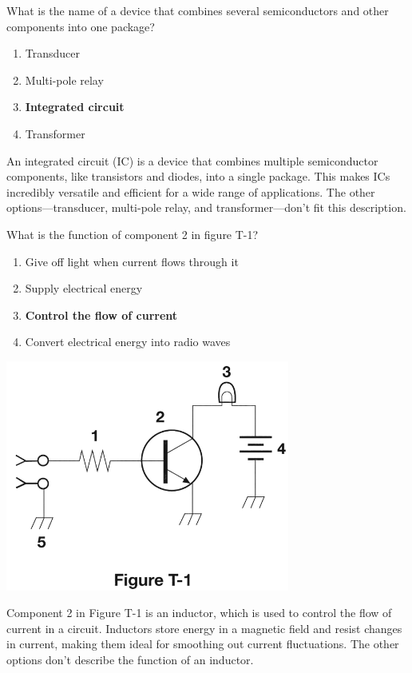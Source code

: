 \begin{tcolorbox}[colback=gray!10!white,colframe=black!75!black,title={T6D09}]
What is the name of a device that combines several semiconductors and other components into one package?
\begin{enumerate}[label=\Alph*),noitemsep]
    \item Transducer
    \item Multi-pole relay
    \item \textbf{Integrated circuit}
    \item Transformer
\end{enumerate}
\end{tcolorbox}
An integrated circuit (IC) is a device that combines multiple semiconductor components, like transistors and diodes, into a single package. This makes ICs incredibly versatile and efficient for a wide range of applications. The other options—transducer, multi-pole relay, and transformer—don’t fit this description.

\begin{tcolorbox}[
    colback=gray!10!white,
    colframe=black!75!black,
    title={T6D10},
    sidebyside,
    sidebyside align=top,
    lefthand width=0.45\textwidth
]
What is the function of component 2 in figure T-1?
\begin{enumerate}[label=\Alph*),noitemsep]
    \item Give off light when current flows through it
    \item Supply electrical energy
    \item \textbf{Control the flow of current}
    \item Convert electrical energy into radio waves
\end{enumerate}
\tcblower
\includegraphics[width=0.7\textwidth]{tech/images/t1.png}
\end{tcolorbox}
Component 2 in Figure T-1 is an inductor, which is used to control the flow of current in a circuit. Inductors store energy in a magnetic field and resist changes in current, making them ideal for smoothing out current fluctuations. The other options don’t describe the function of an inductor.


